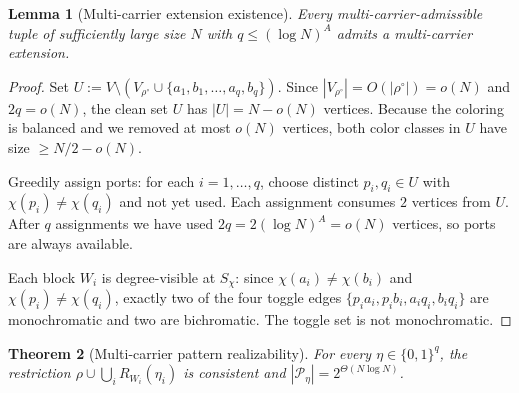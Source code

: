 \documentclass[11pt]{article}
\newtheorem{theorem}{Theorem}[section]
\newtheorem{lemma}[theorem]{Lemma}
\begin{document}
\begin{lemma}[Multi-carrier extension existence]
\label{lem:multi-carrier-extension-existence}
Every multi-carrier-admissible tuple of sufficiently large size $N$ with
$q \le (\log N)^A$ admits a multi-carrier extension.
\end{lemma}

\begin{proof}
Set $U := V \setminus (V_{\rho^\circ} \cup \{a_1, b_1, \ldots, a_q, b_q\})$.
Since $|V_{\rho^\circ}| = O(|\rho^\circ|) = o(N)$ and $2q = o(N)$, the clean
set $U$ has $|U| = N - o(N)$ vertices.  Because the coloring is balanced and
we removed at most $o(N)$ vertices, both color classes in $U$ have size
$\ge N/2 - o(N)$.

Greedily assign ports: for each $i = 1, \ldots, q$, choose distinct
$p_i, q_i \in U$ with $\chi(p_i) \neq \chi(q_i)$ and not yet used.  Each
assignment consumes $2$ vertices from $U$.  After $q$ assignments we have
used $2q = 2(\log N)^A = o(N)$ vertices, so ports are always available.

Each block $W_i$ is degree-visible at $S_\chi$: since $\chi(a_i) \neq
\chi(b_i)$ and $\chi(p_i) \neq \chi(q_i)$, exactly two of the four toggle
edges $\{p_ia_i, p_ib_i, a_iq_i, b_iq_i\}$ are monochromatic and two are
bichromatic.  The toggle set is not monochromatic.
\end{proof}

\begin{theorem}[Multi-carrier pattern realizability]
\label{thm:multi-carrier-realizability}
For every $\eta \in \{0,1\}^q$, the restriction
$\rho \cup \bigcup_i R_{W_i}(\eta_i)$ is consistent and
$|\mathcal{P}_\eta| = 2^{\Theta(N\log N)}$.
\end{theorem}
\end{document}
